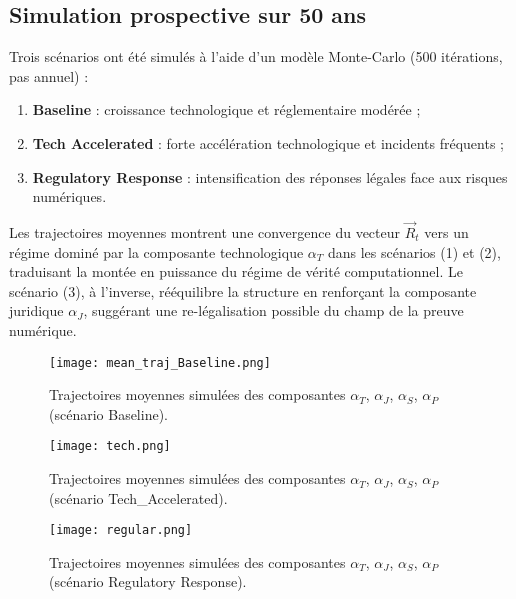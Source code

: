 \documentclass[12pt, a4em]{article}
\begin{document}
	\subsection{ Simulation prospective sur 50 ans}
	
	Trois scénarios ont été simulés à l’aide d’un modèle Monte-Carlo (500 itérations, pas annuel) :
	
	\begin{enumerate}
		\item \textbf{Baseline} : croissance technologique et réglementaire modérée ;
		\item \textbf{Tech Accelerated} : forte accélération technologique et incidents fréquents ;
		\item \textbf{Regulatory Response} : intensification des réponses légales face aux risques numériques.
	\end{enumerate}
	
	Les trajectoires moyennes montrent une convergence du vecteur $\vec{R}_t$ vers un régime dominé par la composante technologique $\alpha_T$ dans les scénarios (1) et (2), traduisant la montée en puissance du régime de vérité computationnel.  
	Le scénario (3), à l’inverse, rééquilibre la structure en renforçant la composante juridique $\alpha_J$, suggérant une re-légalisation possible du champ de la preuve numérique.
	
	\begin{figure}[h]
		\centering
		\begin{minipage}{0.45\textwidth}
			\centering
			\texttt{[image: mean\_traj\_Baseline.png]}
			\caption{Trajectoires moyennes simulées des composantes $\alpha_T$, $\alpha_J$, $\alpha_S$, $\alpha_P$ (scénario Baseline).}
			\label{fig:moyenne baseline}
		\end{minipage}
		\hfill
		\begin{minipage}{0.45\textwidth}
			\centering
			\texttt{[image: tech.png]}
			\caption{Trajectoires moyennes simulées des composantes $\alpha_T$, $\alpha_J$, $\alpha_S$, $\alpha_P$ (scénario Tech\_Accelerated).}
			\label{fig:Moyenne techaccelerated}
		\end{minipage}
		\hfill
		\begin{minipage}{0.45\textwidth}
			\centering
			\texttt{[image: regular.png]}
			\caption{Trajectoires moyennes simulées des composantes $\alpha_T$, $\alpha_J$, $\alpha_S$, $\alpha_P$ (scénario Regulatory Response).}
			\label{fig:moyenne regulatory}
		\end{minipage}
		\vspace{0.3cm}
	\end{figure}
	
\end{document}
